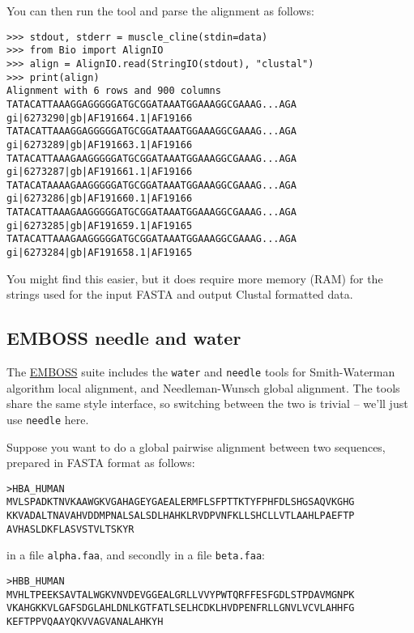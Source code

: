 \noindent You can then run the tool and parse the alignment as follows:

\begin{verbatim}
>>> stdout, stderr = muscle_cline(stdin=data)
>>> from Bio import AlignIO
>>> align = AlignIO.read(StringIO(stdout), "clustal")
>>> print(align)
Alignment with 6 rows and 900 columns
TATACATTAAAGGAGGGGGATGCGGATAAATGGAAAGGCGAAAG...AGA gi|6273290|gb|AF191664.1|AF19166
TATACATTAAAGGAGGGGGATGCGGATAAATGGAAAGGCGAAAG...AGA gi|6273289|gb|AF191663.1|AF19166
TATACATTAAAGAAGGGGGATGCGGATAAATGGAAAGGCGAAAG...AGA gi|6273287|gb|AF191661.1|AF19166
TATACATAAAAGAAGGGGGATGCGGATAAATGGAAAGGCGAAAG...AGA gi|6273286|gb|AF191660.1|AF19166
TATACATTAAAGAAGGGGGATGCGGATAAATGGAAAGGCGAAAG...AGA gi|6273285|gb|AF191659.1|AF19165
TATACATTAAAGAAGGGGGATGCGGATAAATGGAAAGGCGAAAG...AGA gi|6273284|gb|AF191658.1|AF19165
\end{verbatim}

You might find this easier, but it does require more memory (RAM) for the strings
used for the input FASTA and output Clustal formatted data.

\subsection{EMBOSS needle and water}
\label{sec:emboss-needle-water}
The \href{http://emboss.sourceforge.net/}{EMBOSS} suite includes the \texttt{water} and
\texttt{needle} tools for Smith-Waterman algorithm local alignment, and Needleman-Wunsch
global alignment. The tools share the same style interface, so switching between the two
is trivial -- we'll just use \texttt{needle} here.

Suppose you want to do a global pairwise alignment between two sequences, prepared in
FASTA format as follows:

\begin{verbatim}
>HBA_HUMAN
MVLSPADKTNVKAAWGKVGAHAGEYGAEALERMFLSFPTTKTYFPHFDLSHGSAQVKGHG
KKVADALTNAVAHVDDMPNALSALSDLHAHKLRVDPVNFKLLSHCLLVTLAAHLPAEFTP
AVHASLDKFLASVSTVLTSKYR
\end{verbatim}

\noindent in a file \texttt{alpha.faa}, and secondly in a file \texttt{beta.faa}:

\begin{verbatim}
>HBB_HUMAN
MVHLTPEEKSAVTALWGKVNVDEVGGEALGRLLVVYPWTQRFFESFGDLSTPDAVMGNPK
VKAHGKKVLGAFSDGLAHLDNLKGTFATLSELHCDKLHVDPENFRLLGNVLVCVLAHHFG
KEFTPPVQAAYQKVVAGVANALAHKYH
\end{verbatim}

